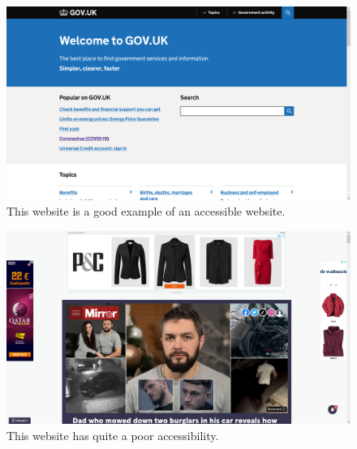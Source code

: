 \begin{figure}[tp]
\centering
\includegraphics[keepaspectratio,width=\linewidth]
{images/gov}

\caption[www.gov.uk]
{%
This website is a good example of an accessible website.
}%
\label{fig:gov}
\end{figure}

\begin{figure}
\centering
\includegraphics[keepaspectratio,width=\linewidth]
{images/mirror}

\caption[www.mirror.co.uk]
{%
This website has quite a poor accessibility.
}%
\label{fig:mirror}
\end{figure}
